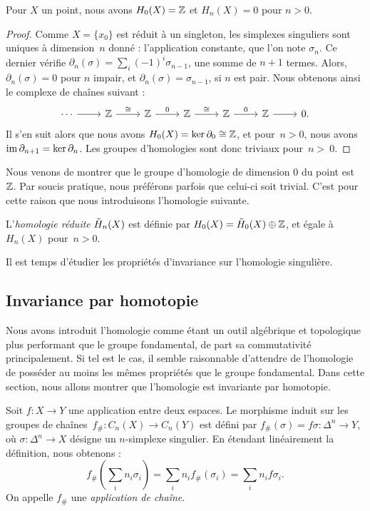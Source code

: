 \begin{proposition}
Pour $X$ un point, nous avons $H_0(X)=\mathbb{Z}$ et $H_n(X)=0$ pour $n>0$.
\end{proposition}
\begin{proof}
Comme $X=\{x_0\}$ est réduit à un singleton, les simplexes singuliers sont uniques à dimension~$n$ donné : l'application constante, que l'on note $\sigma_n$. Ce dernier vérifie $\partial_n(\sigma)=\sum_i(-1)^i\sigma_{n-1}$, une somme de $n+1$ termes. Alors, $\partial_n(\sigma)=0$ pour $n$ impair, et $\partial_n(\sigma)=\sigma_{n-1}$, si $n$ est pair. Nous obtenons ainsi le complexe de chaînes suivant : 
\[\begin{tikzcd}
\centering
\cdots\arrow[r]&\bb{Z}\arrow[r,"\cong"]&\bb{Z}\arrow[r,"0"]&\bb{Z}\arrow[r,"\cong"]&\bb{Z}\arrow[r,"0"]&\bb{Z}\arrow[r]&0.
\end{tikzcd}\]
Il s'en suit alors que nous avons $H_0(X)=\ker\partial_0\cong\mathbb{Z}$, et pour~$n>0$, nous avons~$\mathrm{im}\,\partial_{n+1}=\ker\partial_n$. Les groupes d'homologies sont donc triviaux pour~$n>~0$.
\end{proof}

Nous venons de montrer que le groupe d'homologie de dimension 0 du point est $\mathbb{Z}$. Par soucis pratique, nous préférons parfois que celui-ci soit trivial. C'est pour cette raison que nous introduisons l'homologie suivante.

\begin{definition}
L'\emph{homologie réduite} $\Tilde{H}_n(X)$ est définie par $H_0(X)=\Tilde{H}_0(X)\oplus\mathbb{Z}$, et égale à $H_n(X)$ pour~$n>0$.
\end{definition}

Il est temps d'étudier les propriétés d'invariance sur l'homologie singulière.
\subsection{Invariance par homotopie}

Nous avons introduit l'homologie comme étant un outil algébrique et topologique plus performant que le groupe fondamental, de part sa commutativité principalement. Si tel est le cas, il semble raisonnable d'attendre de l'homologie de posséder au moins les mêmes propriétés que le groupe fondamental. Dans cette section, nous allons montrer que l'homologie est invariante par homotopie.

\begin{definition}\label{def:chain-map}
Soit $f:X\to Y$ une application entre deux espaces. Le morphisme induit sur les groupes de chaînes~$f_\#:C_n(X)\to C_n(Y)$ est défini par $f_\#(\sigma)=f\sigma:\Delta^n\to Y$, où $\sigma:\Delta^n\to X$ désigne un $n$-simplexe singulier. En étendant linéairement la définition, nous obtenons : \[f_\#\left(\sum_in_i\sigma_i\right)=\sum_in_if_\#(\sigma_i)=\sum_in_if\sigma_i.\]On appelle $f_\#$ une \emph{application de chaîne}.
\end{definition}

